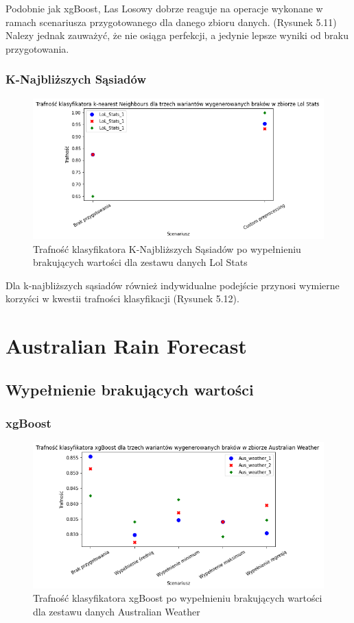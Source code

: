 \documentclass{book}
\begin{document}
    Podobnie jak xgBoost, Las Losowy dobrze reaguje na operacje 
    wykonane w ramach scenariusza przygotowanego dla danego zbioru danych. 
    (Rysunek 5.11) Nalezy jednak zauważyć, że nie osiąga perfekcji, a jedynie 
    lepsze wyniki od braku przygotowania.

\subsubsection{K-Najbliższych Sąsiadów}
    \begin{figure}[H]
    \centerline{\includegraphics[scale=0.5]{Lol_stats_knn_Custom}}
    \centering
    \caption{Trafność klasyfikatora K-Najbliższych Sąsiadów po wypełnieniu brakujących wartości dla zestawu danych Lol Stats}
    \end{figure}

    Dla k-najbliższych sąsiadów również indywidualne podejście przynosi wymierne korzyści w kwestii trafności klasyfikacji (Rysunek 5.12).


\section{Australian Rain Forecast}


\subsection{Wypełnienie brakujących wartości}
\subsubsection{xgBoost} 
\begin{figure}[H]
    \centerline{\includegraphics[scale=0.5]{Aus_Weather_xgb_Wypełnienie_brakujących}}
    \centering
    \caption{Trafność klasyfikatora xgBoost po wypełnieniu brakujących wartości dla zestawu danych Australian Weather}
    \end{figure}
\end{document}
